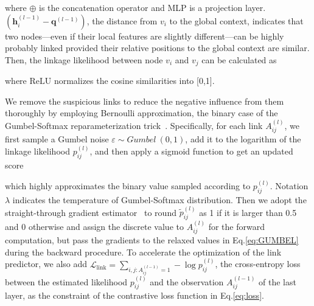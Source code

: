 {\noindent where $\oplus$ is the concatenation operator and MLP is a projection layer. $(\boldsymbol{h}_i^{(l-1)} - \boldsymbol{q}^{(l-1)})$, the distance from $v_i$ to the global context, indicates that two nodes---even if their local features are slightly different---can be highly probably linked  provided their relative positions to the global context are similar. 
Then, the linkage likelihood between node $v_i$ and $v_j$ can be calculated as 


\noindent where $\text{ReLU}$ normalizes the cosine similarities into [0,1].

We remove the suspicious links to reduce the negative influence from them thoroughly by employing Bernoulli approximation, the binary case of the Gumbel-Softmax reparameterization trick~\cite{maddison2016concrete, jang2016categorical}.
Specifically, for each link $A_{ij}^{(l)}$, we first sample a Gumbel noise $\varepsilon \sim Gumbel~(0,1)$, add it to the logarithm of the linkage likelihood $p_{ij}^{(l)}$, and then apply a sigmoid function to get an updated score


\noindent which highly approximates  the binary value sampled according to $p_{ij}^{(l)}$. Notation $\lambda$ indicates the temperature of Gumbel-Softmax distribution. %
Then we adopt  the straight-through gradient estimator~\cite{bengio2013estimating} to round $\tilde{p}^{(l)}_{ij}$ as 1 if it is larger than 0.5 and 0 otherwise and assign the discrete value to ${A}_{ij}^{(l)}$ for the forward computation, but pass the gradients to the relaxed values in Eq.\eqref{eq:GUMBEL} during the backward procedure. To accelerate the optimization of the link predictor, we also add $\mathcal{L}_{\text{link}} = \sum_{i,j: A^{(l-1)}_{ij} = 1} -\log p_{ij}^{(l)}$, the cross-entropy loss between the  estimated likelihood $p_{ij}^{(l)}$ and the observation $A^{(l-1)}_{ij}$ of the last layer, as the constraint of the contrastive loss function in Eq.\eqref{eq:loss}.


}
